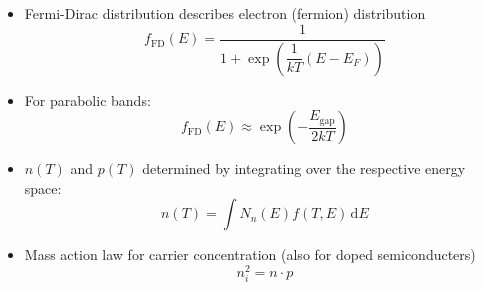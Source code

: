 \begin{itemize}
  \item Fermi-Dirac distribution describes electron (fermion) distribution
        \begin{equation*}
          f_{\mathrm{FD}}(E) = \dfrac{1}{1 + \exp \left(\dfrac{1}{kT} (E - E_{F})\right)}
        \end{equation*}
  \item For parabolic bands:
        \begin{equation*}
          f_{\mathrm{FD}}(E) \approx \exp \left(- \dfrac{E_{\mathrm{gap}}}{2 kT}\right)
        \end{equation*}
  \item $n(T)$ and $p(T)$ determined by integrating over the respective energy space:
        \begin{equation*}
        n(T) = \int N_{n}(E)f(T, E) \, \mathrm{d}E
        \end{equation*}
  \item Mass action law for carrier concentration (also for doped semiconducters)
        \begin{equation*}
          n_{i}^{2} = n \cdot p
        \end{equation*}
\end{itemize}

